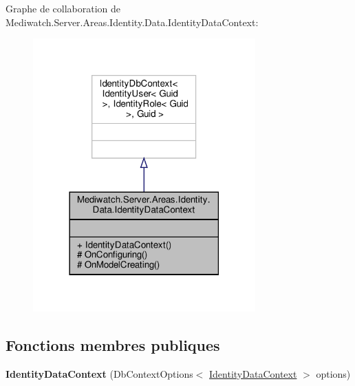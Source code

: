 Graphe de collaboration de Mediwatch.\+Server.\+Areas.\+Identity.\+Data.\+Identity\+Data\+Context\+:
\nopagebreak
\begin{figure}[H]
\begin{center}
\leavevmode
\includegraphics[width=242pt]{class_mediwatch_1_1_server_1_1_areas_1_1_identity_1_1_data_1_1_identity_data_context__coll__graph}
\end{center}
\end{figure}
\subsection*{Fonctions membres publiques}
\begin{DoxyCompactItemize}
\item 
\mbox{\label{class_mediwatch_1_1_server_1_1_areas_1_1_identity_1_1_data_1_1_identity_data_context_ace53da6e49b7d2dff2bb67aad43cfa65}} 
{\bfseries Identity\+Data\+Context} (Db\+Context\+Options$<$ \hyperlink{class_mediwatch_1_1_server_1_1_areas_1_1_identity_1_1_data_1_1_identity_data_context}{Identity\+Data\+Context} $>$ options)
\end{DoxyCompactItemize}

